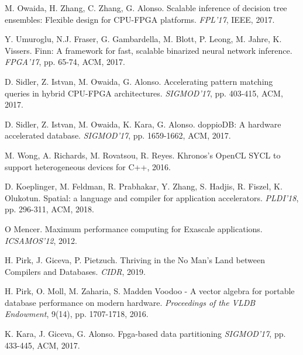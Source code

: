 \documentclass[11pt]{article}
\begin{document}
\begin{thebibliography}{10}
 M. Owaida, H. Zhang, C. Zhang, G. Alonso. \newblock Scalable inference of decision tree ensembles: Flexible design for CPU-FPGA platforms. \newblock \emph{FPL'17}, IEEE, 2017.

 Y. Umuroglu, N.J. Fraser, G. Gambardella, M. Blott, P. Leong, M. Jahre, K. Vissers. \newblock Finn: A framework for fast, scalable binarized neural network inference. \newblock \emph{FPGA'17}, pp. 65-74, ACM, 2017.

 D. Sidler, Z. Istvan, M. Owaida, G. Alonso. \newblock Accelerating pattern matching queries in hybrid CPU-FPGA architectures. \newblock \emph{SIGMOD'17}, pp. 403-415, ACM, 2017.

 D. Sidler, Z. Istvan, M. Owaida, K. Kara, G. Alonso. \newblock doppioDB: A hardware accelerated database. \newblock \emph{SIGMOD'17}, pp. 1659-1662, ACM, 2017.

 M. Wong, A. Richards, M. Rovatsou, R. Reyes. \newblock Khronos's OpenCL SYCL to support heterogeneous devices for C++, 2016.

 D. Koeplinger, M. Feldman, R. Prabhakar, Y. Zhang, S. Hadjis, R. Fiszel, K. Olukotun. \newblock Spatial: a language and compiler for application accelerators. \newblock \emph{PLDI'18}, pp. 296-311, ACM, 2018.

 O Mencer. \newblock Maximum performance computing for Exascale applications. \newblock \emph{ICSAMOS'12}, 2012.

 H. Pirk, J. Giceva, P. Pietzuch. \newblock Thriving in the No Man’s Land between Compilers and Databases. \newblock \emph{CIDR}, 2019.

 H. Pirk, O. Moll, M. Zaharia, S. Madden \newblock Voodoo - A vector algebra for portable database performance on modern hardware. \newblock \emph{Proceedings of the VLDB Endowment}, 9(14), pp. 1707-1718, 2016.

 K. Kara, J. Giceva, G. Alonso. \newblock Fpga-based data partitioning \newblock \emph{SIGMOD'17}, pp. 433-445, ACM, 2017.

\end{thebibliography} 
\end{document}
